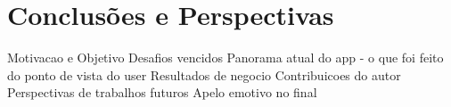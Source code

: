 \chapter{Conclusões e Perspectivas} \label{cap:conclusions}


Motivacao e Objetivo
Desafios vencidos
Panorama atual do app - o que foi feito do ponto de vista do user
Resultados de negocio
Contribuicoes do autor
Perspectivas de trabalhos futuros
Apelo emotivo no final